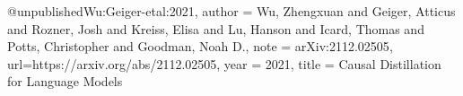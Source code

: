 @unpublished{Wu:Geiger-etal:2021,
    author = {Wu, Zhengxuan and Geiger, Atticus and Rozner, Josh and Kreiss, Elisa and Lu, Hanson and Icard, Thomas and Potts, Christopher and Goodman, Noah D.},
    note = {arXiv:2112.02505},
    url={https://arxiv.org/abs/2112.02505},
    year = {2021},
    title = {Causal Distillation for Language Models}}
